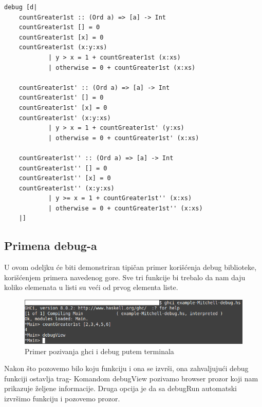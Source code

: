 \documentclass[a4paper]{article}
\begin{document}
{{\begin{lstlisting}[caption={Okružujemo naš kod funkcijom debug, iz biblioteke Debug, sa uključivanjem ekstenzija navedenih u prvom redu}, language=Haskell]
debug [d|
    countGreater1st :: (Ord a) => [a] -> Int
    countGreater1st [] = 0
    countGreater1st [x] = 0
    countGreater1st (x:y:xs) 
            | y > x = 1 + countGreater1st (x:xs)
            | otherwise = 0 + countGreater1st (x:xs)
    
    countGreater1st' :: (Ord a) => [a] -> Int
    countGreater1st' [] = 0
    countGreater1st' [x] = 0
    countGreater1st' (x:y:xs) 
            | y > x = 1 + countGreater1st' (y:xs)
            | otherwise = 0 + countGreater1st' (x:xs)

    countGreater1st'' :: (Ord a) => [a] -> Int
    countGreater1st'' [] = 0
    countGreater1st'' [x] = 0
    countGreater1st'' (x:y:xs) 
            | y >= x = 1 + countGreater1st'' (x:xs)
            | otherwise = 0 + countGreater1st'' (x:xs)
    |]
\end{lstlisting}

\subsection{Primena debug-a}
U ovom odeljku će biti demonstriran tipičan primer korišćenja debug biblioteke, korišćenjem primera navedenog gore. Sve tri funkcije bi trebalo da nam daju koliko elemenata u listi su veći od prvog elementa liste.

\begin{figure}[h!]
\begin{center}
\includegraphics[scale=0.5]{pozivanje-mitchell.png}
\caption{Primer pozivanja ghci i debug putem terminala}
\end{center}
\end{figure}

Nakon što pozovemo bilo koju funkciju i ona se izvrši, ona zahvaljujući debug funkciji ostavlja trag- Komandom debugView pozivamo browser prozor koji nam prikazuje željene informacije. Druga opcija je da sa debugRun automatski izvršimo funkciju i pozovemo prozor.

}}
\end{document}
